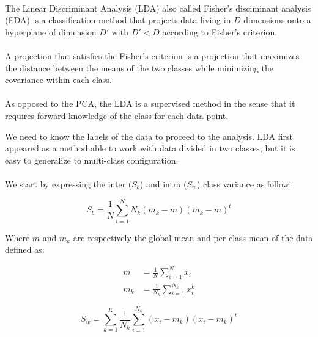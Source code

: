 
\paragraph{}
The Linear Discriminant Analysis (LDA) also called Fisher's disciminant analysis (FDA) is a classification method that projects data living in $D$ dimensions onto a hyperplane of dimension $D'$ with $D' < D$ according to Fisher's criterion. 

\paragraph{}
A projection that satisfies the Fisher's criterion is a projection that maximizes the distance between the means of the two classes while minimizing the covariance within each class.

\paragraph{}
As opposed to the PCA, the LDA is a supervised method in the sense that it requires forward knowledge of the class for each data point.

We need to know the labels of the data to proceed to the analysis. LDA first appeared as a method able to work with data divided in two classes, but it is easy to generalize to multi-class configuration.

\paragraph{}
We start by expressing the inter ($S_b$) and intra ($S_w$) class variance as follow:

\begin{equation*}
S_b = \frac{1}{N}\sum_{i = 1}^N N_k(m_k - m)(m_k - m)^t
\end{equation*}

Where $m$ and $m_k$ are respectively the global mean and per-class mean of the data defined as:

\begin{align*}
m &= \frac{1}{N}\sum_{i = 1}^{N} x_i \\
m_k &= \frac{1}{N_k}\sum_{i = 1}^{N_k} x_i^k
\end{align*}

\begin{equation*}
S_w = \sum_{k = 1}^{K}\frac{1}{N_k}\sum_{i = 1}^{N_k} (x_i - m_k)(x_i - m_k)^t
\end{equation*}

